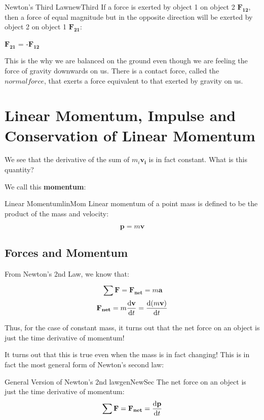 \documentclass{report}
\begin{document}
\begin{mytheo}{Newton's Third Law}{newThird}
    If a force is exerted by object 1 on object 2 $\mathbf{F_{12}}$, then a force of equal magnitude but in the opposite direction will be exerted by object 2 on object 1 $\mathbf{F_{21}}$:
    
    $\mathbf{F_{21}}$ = -$\mathbf{F_{12}}$
\end{mytheo}


This is the why we are balanced on the ground even though we are feeling the force of gravity downwards on us. There is a contact force, called the $normal force$, that exerts a force equivalent to that exerted by gravity on us.






\section{Linear Momentum, Impulse and Conservation of Linear Momentum}


We see that the derivative of the sum of $m_i\mathbf{v_i}$ is in fact constant. What is this quantity?

We call this \textbf{momentum}:

\begin{mytheo}{Linear Momentum}{linMom}
    Linear momentum of a point mass is defined to be the product of the mass and velocity:
    
    $$\mathbf{p} = m\mathbf{v}$$
    
\end{mytheo}


\subsection{Forces and Momentum}

From Newton's 2nd Law, we know that:

$$\sum \mathbf{F} = \mathbf{F_{net}} = m\mathbf{a}$$
$$\mathbf{F_{net}} = m\dv{\mathbf{v}}{t} = \dv{(m\mathbf{v})}{t}$$

Thus, for the case of constant mass, it turns out that the net force on an object is just the time derivative of momentum!

It turns out that this is true even when the mass is in fact changing! This is in fact the most general form of Newton's second law:

\begin{mytheo}{General Version of Newton's 2nd law}{genNewSec}
    The net force on an object is just the time derivative of momentum:
    $$\sum \mathbf{F} = \mathbf{F_{net}} = \dv{\mathbf{p}}{t} $$
\end{mytheo}
\end{document}
